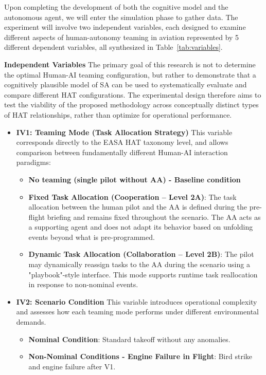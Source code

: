 \documentclass[12pt,a4paper]{article} %
\begin{document}
	Upon completing the development of both the cognitive model and the autonomous agent, we will enter the simulation phase to gather data. The experiment will involve two independent variables, each designed to examine different aspects of human-autonomy teaming in aviation represented by 5 different dependent variables, all synthesized in Table~\ref{tab:variables}.
	
	\textbf{Independent Variables}
	The primary goal of this research is not to determine the optimal Human-AI teaming configuration, but rather to demonstrate that a cognitively plausible model of SA can be used to systematically evaluate and compare different HAT configurations. The experimental design therefore aims to test the viability of the proposed methodology across conceptually distinct types of HAT relationships, rather than optimize for operational performance.

	\begin{itemize}
	\item \textbf{IV1: Teaming Mode (Task Allocation Strategy)}
	This variable corresponds directly to the EASA HAT taxonomy level, and allows comparison between fundamentally different Human-AI interaction paradigms:

	\begin{itemize}
	\item \textbf{No teaming (single pilot without AA) - Baseline condition}
	\item \textbf{Fixed Task Allocation (Cooperation – Level 2A)}:  
	The task allocation between the human pilot and the AA is defined during the pre-flight briefing and remains fixed throughout the scenario. The AA acts as a supporting agent and does not adapt its behavior based on unfolding events beyond what is pre-programmed.

	\item \textbf{Dynamic Task Allocation (Collaboration – Level 2B)}:  
	The pilot may dynamically reassign tasks to the AA during the scenario using a "playbook"-style interface. This mode supports runtime task reallocation in response to non-nominal events.
	\end{itemize}

	\item \textbf{IV2: Scenario Condition}
	This variable introduces operational complexity and assesses how each teaming mode performs under different environmental demands.

	\begin{itemize}
	\item \textbf{Nominal Condition}:  
	Standard takeoff without any anomalies.
	\item \textbf{Non-Nominal Conditions - Engine Failure in Flight}: Bird strike and engine failure after V1.
	\end{itemize}
	\end{itemize}
\end{document}
